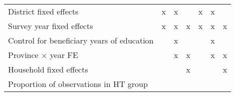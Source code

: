 {\begin{tabular}{l*{6}{c}}
District fixed effects&           x         &           x         &                     &           x         &           x         &                     \\
Survey year fixed effects&           x         &           x         &           x         &           x         &           x         &           x         \\
Control for beneficiary years of education&                     &           x         &                     &                     &           x         &                     \\
Province $\times$  year FE&                     &           x         &           x         &                     &           x         &           x         \\
Household fixed effects&                     &                     &           x         &                     &                     &           x         \\
Proportion of observations in HT group&                     &                     &                     &                     &                     &                     \\
\bottomrule
\end{tabular}
}
